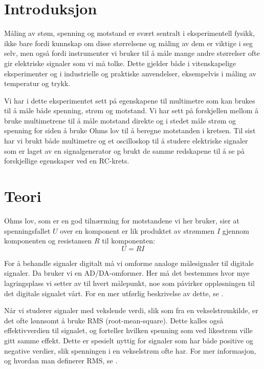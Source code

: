\documentclass[reprint, english,notitlepage]{revtex4-1}  %
\begin{document}
\section{Introduksjon}

Måling av støm, spenning og motstand er svært sentralt i eksperimentell fysikk, ikke bare fordi kunnskap om disse størrelsene og måling av dem er viktige i seg selv, men også fordi instrumenter vi bruker til å måle mange andre størrelser ofte gir elektriske signaler som vi må tolke. Dette gjelder både i vitenskapelige eksperimenter og i industrielle og praktiske anvendelser, eksempelvis i måling av temperatur og trykk.

Vi har i dette eksperimentet sett på egenskapene til multimetre som kan brukes til å måle både spenning, strøm og motstand. Vi har sett på forskjellen mellom å bruke multimetrene til å måle motstand direkte og i stedet måle strøm og spenning for siden å bruke Ohms lov til å beregne motstanden i kretsen. Til sist har vi brukt både multimetre og et oscilloskop til å studere elektriske signaler som er laget av en signalgenerator og brukt de samme redskapene til å se på forskjellige egenskaper ved en RC-krets.


\section{Teori}

Ohms lov, som er en god tilnærming for motstandene vi her bruker, sier at spenningsfallet $U$ over en komponent er lik produktet av strømmen $I$ gjennom komponenten og resistansen $R$ til komponenten:
\begin{equation}
  \label{eq:ohms_lov}
  U = R I
\end{equation}

For å behandle signaler digitalt må vi omforme analoge målesignaler til digitale signaler. Da bruker vi en AD/DA-omformer. Her må det bestemmes hvor mye lagringsplass vi setter av til hvert målepunkt, noe som påvirker oppløsningen til det digitale signalet vårt. For en mer utførlig beskrivelse av dette, se \citep{oppgave}.

Når vi studerer signaler med vekslende verdi, slik som fra en vekselstrømkilde, er det ofte lønnsomt å bruke RMS (root-mean-square). Dette kalles også effektivverdien til signalet, og forteller hvilken spenning som ved likestrøm ville gitt samme effekt. Dette er spesielt nyttig for signaler som har både positive og negative verdier, slik spenningen i en vekselstrøm ofte har. For mer informasjon, og hvordan man definerer RMS, se \citep{oppgave}.
\end{document}

